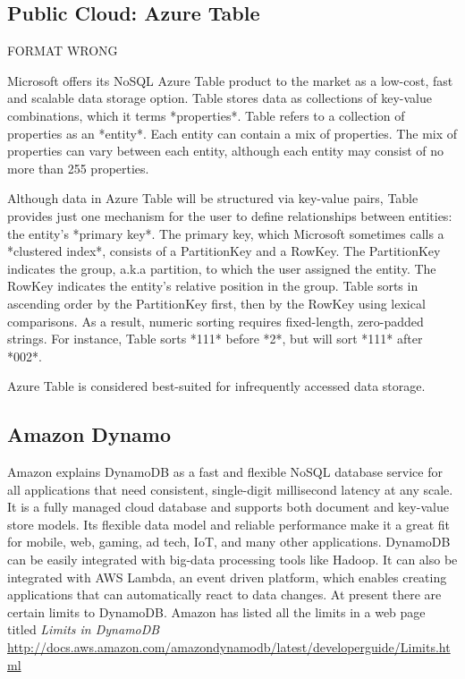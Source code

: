 \subsection{Public Cloud: Azure Table \cv}

     FORMAT WRONG

     Microsoft offers its NoSQL Azure Table product to the market as a
     low-cost, fast and scalable data storage
     option. \cite{www-what-to-use} Table stores data as collections
     of key-value combinations, which it terms *properties*.  Table
     refers to a collection of properties as an *entity*.  Each entity
     can contain a mix of properties.  The mix of properties can vary
     between each entity, although each entity may consist of no more
     than 255 properties. \cite{www-blobqueuetable}

     Although data in Azure Table will be structured via key-value
     pairs, Table provides just one mechanism for the user to define
     relationships between entities: the entity's *primary key*.  The
     primary key, which Microsoft sometimes calls a *clustered index*,
     consists of a PartitionKey and a RowKey.  The PartitionKey
     indicates the group, a.k.a partition, to which the user assigned
     the entity.  The RowKey indicates the entity's relative position
     in the group.  Table sorts in ascending order by the PartitionKey
     first, then by the RowKey using lexical comparisons.  As a
     result, numeric sorting requires fixed-length, zero-padded
     strings.  For instance, Table sorts *111* before *2*, but will
     sort *111* after *002*. \cite{www-scalable-partitioning}

     Azure Table is considered best-suited for infrequently accessed
     data storage.

\subsection{Amazon Dynamo}

     Amazon explains DynamoDB as \cite{www.dyndb} a fast and flexible 
     NoSQL database service for all applications that need consistent, 
     single-digit millisecond latency at any scale. It is a fully managed 
     cloud database and supports both document and key-value store models. 
     Its flexible data model and reliable performance make it a great fit 
     for mobile, web, gaming, ad tech, IoT, and many other applications. 
     DynamoDB can be easily integrated with big-data processing tools like 
     Hadoop. It can also be integrated with AWS Lambda, an event driven platform, 
     which enables creating applications that can automatically react to data 
     changes. At present there are certain limits to DynamoDB. Amazon has listed 
     all the limits in a web page titled {\em Limits in DynamoDB }
     \url{http://docs.aws.amazon.com/amazondynamodb/latest/developerguide/Limits.html}


